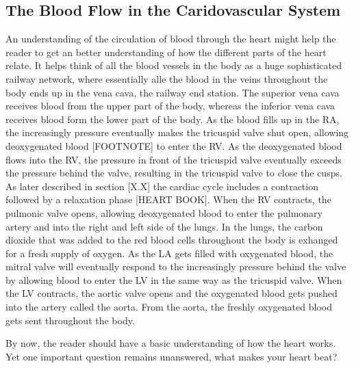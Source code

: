 
\subsection{The Blood Flow in the Caridovascular System}
An understanding of the circulation of blood through the heart might help the reader to get an better understanding of how the different parts of the heart relate. It helps think of all the blood vessels in the body as a huge sophisticated railway network, where essentially alle the blood in the veins throughout the body ends up in the vena cava, the railway end station. The superior vena cava receives blood from the upper part of the body, whereas the inferior vena cava receives blood form the lower part of the body. As the blood fills up in the RA, the increasingly pressure eventually makes the tricuspid valve shut open, allowing deoxygenated blood [FOOTNOTE] to enter the RV. As the deoxygenated blood flows into the RV, the pressure in front of the tricuspid valve eventually exceeds the pressure behind the valve, resulting in the tricuspid valve to close the cusps. As later described in section [X.X] the cardiac cycle includes a contraction followed by a relaxation phase [HEART BOOK]. When the RV contracts, the pulmonic valve opens, allowing deoxygenated blood to enter the pulmonary artery and into the right and left side of the lungs. In the lungs, the carbon dioxide that was added to the red blood cells throughout the body is exhanged for a fresh supply of oxygen.
As the LA gets filled with oxygenated blood, the mitral valve will eventually respond to the increasingly pressure behind the valve by allowing blood to enter the LV in the same way as the tricuspid valve. When the LV contracts, the aortic valve opens and the oxygenated blood gets pushed into the artery called the aorta. From the aorta, the freshly oxygenated blood gets sent throughout the body.

By now, the reader should have a basic understanding of how the heart works. Yet one important question remains unanswered, what makes your heart beat?

